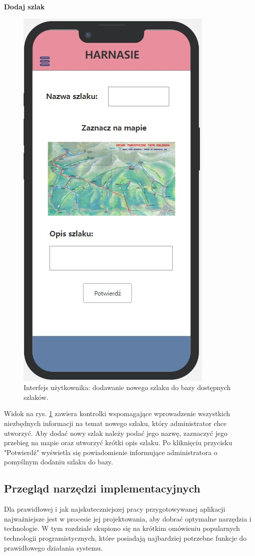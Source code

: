    \textbf{Dodaj szlak}
     \begin{figure}[H]
        \centering
        \includegraphics[scale=0.5]{img/interfejsy/if_nowy_szlak.jpg}
        \caption{Interfejs użytkownika: dodawanie nowego szlaku do bazy dostępnych szlaków.}
        \label{interfejs:dodaj}
    \end{figure}
   Widok na rys. \ref{interfejs:dodaj} zawiera kontrolki wspomagające wprowadzenie wszystkich niezbędnych informacji na temat nowego szlaku, który administrator chce utworzyć. Aby dodać nowy szlak należy podać jego nazwę, zaznaczyć jego przebieg na mapie oraz utworzyć krótki opis szlaku. Po kliknięciu przycisku "Potwierdź" wyświetla się powiadomienie informujące administratora o pomyślnym dodaniu szlaku do bazy.

   \subsection{Przegląd narzędzi implementacyjnych}
Dla prawidłowej i jak najskuteczniejszej pracy przygotowywanej aplikacji najważniejsze jest w procesie jej projektowania, aby dobrać optymalne narzędzia i technologie. W tym rozdziale skupiono się na krótkim omówieniu popularnych technologii programistycznych, które posiadają najbardziej potrzebne funkcje do prawidłowego działania systemu.

